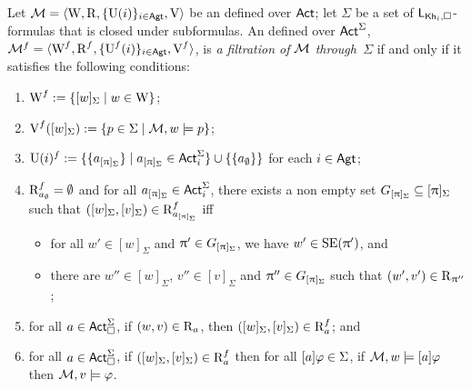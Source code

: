 \begin{definition} \label{def:filtrations}
Let $\mathcal{M} = \langle \operatorname{W},\operatorname{R}, \{ \operatorname{U}(i) \}_{i\in {\rm \sf Agt}}, \operatorname{V} \rangle$ be an \ults defined over ${\rm \sf Act}$; let $\Sigma$ be a set of $\mathsf{L}_{{\sf Kh}_i,\square}$-formulas that is closed under subformulas. An \ults defined over ${\rm \sf Act}^\Sigma$, $\mathcal{M}^f = \langle \operatorname{W}^f,\operatorname{R}^f, \{ \operatorname{U}^f(i) \}_{i\in {\rm \sf Agt}}, \operatorname{V}^f \rangle$, is \emph{a filtration of $\mathcal{M}$ through~$\Sigma$} if and only if it satisfies the following conditions:

\begin{enumerate}
\item $\operatorname{W}^f := \{ [w]_\Sigma \mid w \in \operatorname{W} \}$;
\item $\operatorname{V}^f([w]_\Sigma) := \{ p \in \Sigma \mid \mathcal{M},w\models p \}$;
\item $\operatorname{U}(i)^f := \{ \{ a_{[\uppi]_{\Sigma}} \} \mid a_{[\uppi]_{\Sigma}} \in {\rm \sf Act}^\Sigma_i \} \cup \{ \{ a_\emptyset \} \}$ for each $i \in {\rm \sf Agt}$;
\item \label{item:khiml-fil} $\operatorname{R}^f_{a_\emptyset} = \emptyset$ and for all $a_{[\uppi]_\Sigma} \in {\rm \sf Act}^\Sigma_i$, there exists a non empty set $G_{[\uppi]_\Sigma} \subseteq [\uppi]_\Sigma$ such that $([w]_\Sigma,[v]_\Sigma) \in \operatorname{R}^f_{a_{[\uppi]_\Sigma}}$ iff
\begin{itemize}
\item for all $w' \in [w]_\Sigma$ and $\uppi' \in G_{[\uppi]_\Sigma}$, we have $w' \in \operatorname{SE}(\uppi')$, and
\item there are $w'' \in [w]_\Sigma$, $v'' \in [v]_\Sigma$ and $\uppi'' \in G_{[\uppi]_\Sigma}$ such that $(w',v') \in \operatorname{R}_{\uppi''}$;
\end{itemize}
\item \label{item:khiml-fil-a1} for all $a \in {\rm \sf Act}^\Sigma_\square$, if $(w,v) \in \operatorname{R}_a$, then $([w]_\Sigma,[v]_\Sigma) \in \operatorname{R}^f_a$; and
\item \label{item:khiml-fil-a2} for all $a \in {\rm \sf Act}^\Sigma_\square$, if $([w]_\Sigma,[v]_\Sigma) \in \operatorname{R}^f_a$ then for all $[a] \varphi \in \Sigma$, if $\mathcal{M},w \models [a]\varphi$ then $\mathcal{M},v \models \varphi$.
\end{enumerate}
\end{definition}

\medskip

